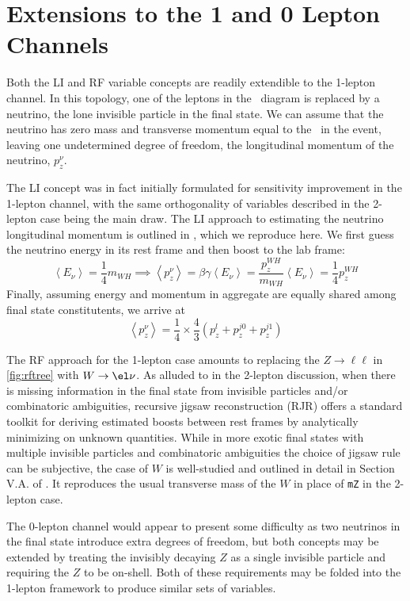 \section{Extensions to the 1 and 0 Lepton Channels}
Both the LI and RF variable concepts are readily extendible to the 1-lepton channel.  In this topology, one of the leptons in the \ZH\, diagram is replaced by a neutrino, the lone invisible particle in the final state.  We can assume that the neutrino has zero mass and transverse momentum equal to the \met\, in the event, leaving one undetermined degree of freedom, the longitudinal momentum of the neutrino, $p_z^{\nu}$.  

The LI concept was in fact initially formulated for sensitivity improvement in the 1-lepton channel, with the same orthogonality of variables described in the 2-lepton case being the main draw.  The LI approach to estimating the neutrino longitudinal momentum is outlined in \cite{litalk}, which we reproduce here.  We first guess the neutrino energy in its rest frame and then boost to the lab frame:
\begin{equation}
\left<E_\nu\right>=\frac{1}{4}m_{WH}\implies \left<p_z^{\nu}\right>=\beta\gamma\left<E_\nu\right>=\frac{p_z^{WH}}{m_{WH}}\left<E_\nu\right>=\frac{1}{4}p_z^{WH}
\end{equation}
Finally, assuming energy and momentum in aggregate are equally shared among final state constitutents, we arrive at
\begin{equation}
\label{eqn:lipz}
\left<p_z^{\nu}\right>=\frac{1}{4}\times \frac{4}{3}\left(p_z^l+p_z^{j0}+p_z^{j1}\right)
\end{equation}

The RF approach for the 1-lepton case amounts to replacing the $Z\to\ell\ell$ in \ref{fig:rftree} with $W\to\el\nu$.  As alluded to in the 2-lepton discussion, when there is missing information in the final state from invisible particles and/or combinatoric ambiguities, recursive jigsaw reconstruction (RJR) offers a standard toolkit for deriving estimated boosts between rest frames by analytically minimizing on unknown quantities.  While in more exotic final states with multiple invisible particles and combinatoric ambiguities the choice of jigsaw rule can be subjective, the case of $W$ is well-studied and outlined in detail in Section V.A. of \cite{rjr}.  It reproduces the usual transverse mass of the $W$ in place of \texttt{mZ} in the 2-lepton case.

The 0-lepton channel would appear to present some difficulty as two neutrinos in the final state introduce extra degrees of freedom, but both concepts may be extended by treating the invisibly decaying $Z$ as a single invisible particle and requiring the $Z$ to be on-shell.  Both of these requirements may be folded into the 1-lepton framework to produce similar sets of variables.  


